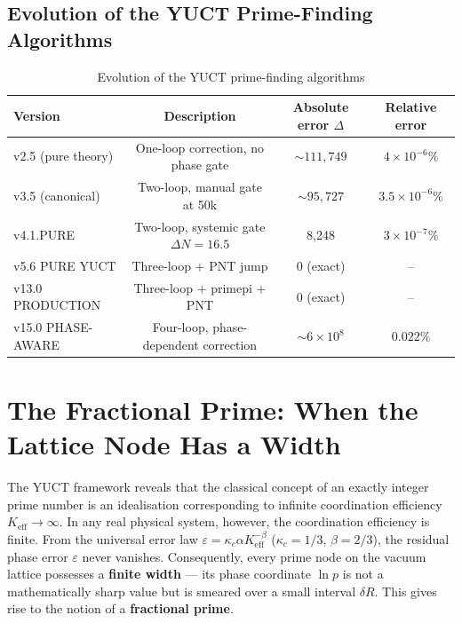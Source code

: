 \documentclass[12pt,a4paper]{article}
\theoremstyle{remark}
\begin{document}
	\subsection{Evolution of the YUCT Prime-Finding Algorithms}
	
	\begin{table}[H]
		\centering
		\caption{Evolution of the YUCT prime-finding algorithms}
		\label{tab:all-versions}
		\begin{tabular}{lccc}
			\toprule
			Version & Description & Absolute error \(\Delta\) & Relative error \\
			\midrule
			v2.5 (pure theory) & One-loop correction, no phase gate & \(\sim 111,749\) & \(4\times10^{-6}\%\) \\
			v3.5 (canonical) & Two-loop, manual gate at 50k & \(\sim 95,727\) & \(3.5\times10^{-6}\%\) \\
			v4.1.PURE & Two-loop, systemic gate \(\Delta N=16.5\) & 8,248 & \(3\times10^{-7}\%\) \\
			v5.6 PURE YUCT & Three-loop + PNT jump & 0 (exact) & -- \\
			v13.0 PRODUCTION & Three-loop + primepi + PNT & 0 (exact) & -- \\
			v15.0 PHASE-AWARE & Four-loop, phase-dependent correction & \(\sim 6\times10^8\) & \(0.022\%\) \\
			\bottomrule
		\end{tabular}
	\end{table}
	
	\newpage
	\section{The Fractional Prime: When the Lattice Node Has a Width}
	\label{sec:fractional-prime}
	
	The YUCT framework reveals that the classical concept of an exactly integer prime number is an idealisation corresponding to infinite coordination efficiency \(K_{\mathrm{eff}} \to \infty\). In any real physical system, however, the coordination efficiency is finite. From the universal error law \(\varepsilon = \kappa_c \alpha K_{\mathrm{eff}}^{-\beta}\) (\(\kappa_c = 1/3\), \(\beta = 2/3\)), the residual phase error \(\varepsilon\) never vanishes. Consequently, every prime node on the vacuum lattice possesses a \textbf{finite width} — its phase coordinate \(\ln p\) is not a mathematically sharp value but is smeared over a small interval \(\delta R\). This gives rise to the notion of a \textbf{fractional prime}.
	
\end{document}
